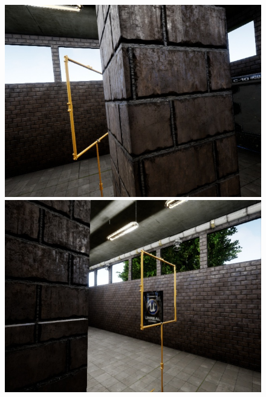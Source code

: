 \documentclass{article}
\begin{document}
\begin{figure}[htbp]	
	\begin{minipage}{0.3\linewidth}
		\includegraphics[width=\linewidth]{size_examples/005-01 (1).jpg}
	\end{minipage}
	\hfill
	\begin{minipage}{0.3\linewidth}
		\includegraphics[width=\linewidth]{size_examples/005-01 (8).jpg}
	\end{minipage}
	\hfill
	\begin{minipage}{0.3\linewidth}

\end{minipage}
\end{figure}
\end{document}
